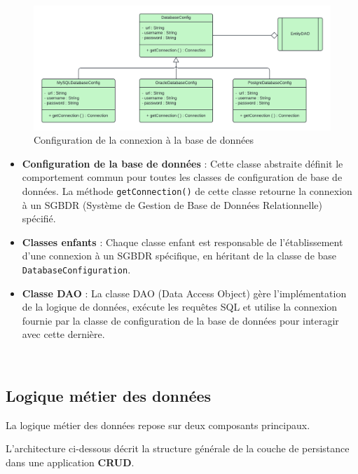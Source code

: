 \documentclass{article}
\begin{document}
\begin{figure}[H]
    \centering
    \begin{framed}
        \includegraphics[width=0.8\linewidth]{images/jdbc_setup.png}
    \end{framed}
    \caption{Configuration de la connexion à la base de données}
    \label{fig:spring-logo}
\end{figure}


\begin{itemize}
    \item \textbf{Configuration de la base de données} : Cette classe abstraite définit le comportement commun pour toutes les classes de configuration de base de données. La méthode \texttt{getConnection()} de cette classe retourne la connexion à un SGBDR (Système de Gestion de Base de Données Relationnelle) spécifié.
    
    \item \textbf{Classes enfants} : Chaque classe enfant est responsable de l'établissement d'une connexion à un SGBDR spécifique, en héritant de la classe de base \texttt{DatabaseConfiguration}.
    
    \item \textbf{Classe DAO} : La classe DAO (Data Access Object) gère l'implémentation de la logique de données, exécute les requêtes SQL et utilise la connexion fournie par la classe de configuration de la base de données pour interagir avec cette dernière.
\end{itemize}

\\

\subsection{Logique métier des données}

La logique métier des données repose sur deux composants principaux. 

L'architecture ci-dessous décrit la structure générale de la couche de persistance dans une application \textbf{CRUD}.
\end{document}
